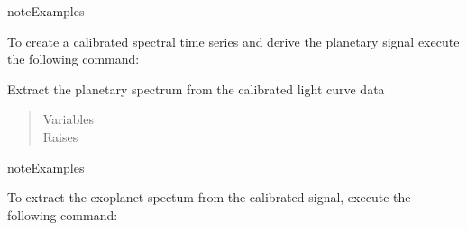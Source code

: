 \documentclass[a4paper,10pt,english]{sphinxmanual}
\begin{document}
\begin{fulllineitems}
\begin{fulllineitems}
\begin{quote}
\begin{description}
\end{description}\end{quote}

\begin{sphinxadmonition}{note}{Examples}

To create a calibrated spectral time series and derive the
planetary signal execute the following command:

%
\begin{sphinxVerbatim}[commandchars=\\\{\}]
\end{sphinxVerbatim}
\end{sphinxadmonition}

\end{fulllineitems}


\begin{fulllineitems}
\label{\detokenize{cascade.TSO:cascade.TSO.TSO.TSOSuite.extract_spectrum}}
Extract the planetary spectrum from the calibrated light curve data
\begin{quote}\begin{description}
\item[{Variables}] \leavevmode
{} \textendash{} 

\item[{Raises}] \leavevmode
{}

\end{description}\end{quote}

\begin{sphinxadmonition}{note}{Examples}

To extract the exoplanet spectum from the calibrated signal,
execute the following command:

%
\begin{sphinxVerbatim}[commandchars=\\\{\}]
\end{sphinxVerbatim}
\end{sphinxadmonition}


\end{fulllineitems}
\end{fulllineitems}
\end{document}
